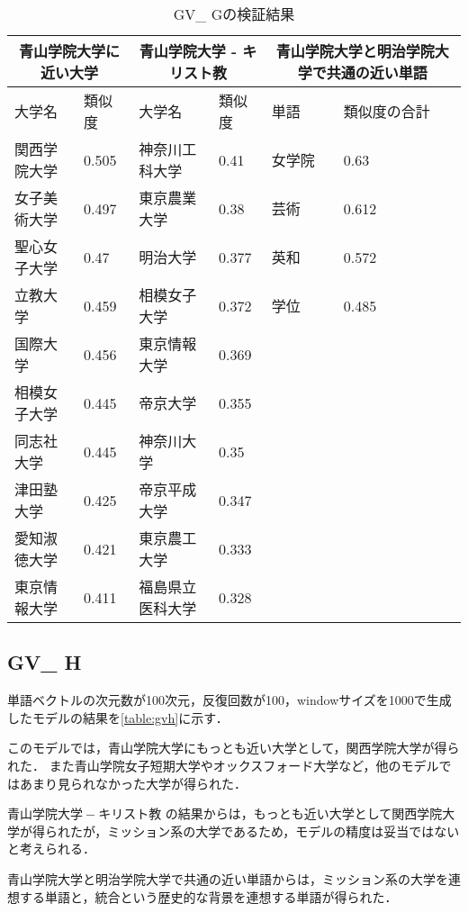 \begin{table}[H]
\caption{GV\_ Gの検証結果}
\centering
\footnotesize
\begin{tabular}{ll|ll|ll}
\hline
\multicolumn{2}{c}{青山学院大学に近い大学} & \multicolumn{2}{c}{青山学院大学 - キリスト教} & \multicolumn{2}{c}{青山学院大学と明治学院大学で共通の近い単語}
\\ \hline
大学名 & 類似度 & 大学名 & 類似度 & 単語 & 類似度の合計
\\ \hline \hline
関西学院大学 & 0.505 & 神奈川工科大学 & 0.41 & 女学院 & 0.63\\
女子美術大学 & 0.497 & 東京農業大学 & 0.38 & 芸術 & 0.612\\
聖心女子大学 & 0.47 & 明治大学 & 0.377 & 英和 & 0.572\\
立教大学 & 0.459 & 相模女子大学 & 0.372 & 学位 & 0.485\\
国際大学 & 0.456 & 東京情報大学 & 0.369 & & \\
相模女子大学 & 0.445 & 帝京大学 & 0.355 & & \\
同志社大学 & 0.445 & 神奈川大学 & 0.35 & & \\
津田塾大学 & 0.425 & 帝京平成大学 & 0.347 & & \\
愛知淑徳大学 & 0.421 & 東京農工大学 & 0.333 & & \\
東京情報大学 & 0.411 & 福島県立医科大学 & 0.328 & & \\ \hline
\end{tabular}
\label{table:gvg}
\end{table}

\subsection{GV\_ H}
単語ベクトルの次元数が100次元，反復回数が100，windowサイズを1000で生成したモデルの結果を\ref{table:gvh}に示す．

このモデルでは，青山学院大学にもっとも近い大学として，関西学院大学が得られた．
また青山学院女子短期大学やオックスフォード大学など，他のモデルではあまり見られなかった大学が得られた．

$ 青山学院大学 - キリスト教 $ の結果からは，もっとも近い大学として関西学院大学が得られたが，ミッション系の大学であるため，モデルの精度は妥当ではないと考えられる．

青山学院大学と明治学院大学で共通の近い単語からは，ミッション系の大学を連想する単語と，統合という歴史的な背景を連想する単語が得られた．

